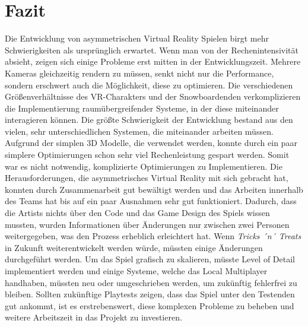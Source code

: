 \chapter{Fazit}
Die Entwicklung von asymmetrischen Virtual Reality Spielen birgt mehr Schwierigkeiten als ursprünglich erwartet. Wenn man von der Rechenintensivität absieht, zeigen sich einige Probleme erst mitten in der Entwicklungszeit. Mehrere Kameras gleichzeitig rendern zu müssen, senkt nicht nur die Performance, sondern erschwert auch die Möglichkeit, diese zu optimieren. Die verschiedenen Größenverhältnisse des VR-Charakters und der Snowboardenden verkomplizieren die Implementierung raumübergreifender Systeme, in der diese miteinander interagieren können. Die größte Schwierigkeit der Entwicklung bestand aus den vielen, sehr unterschiedlichen Systemen, die miteinander arbeiten müssen. Aufgrund der simplen 3D Modelle, die verwendet werden, konnte durch ein paar simplere Optimierungen schon sehr viel Rechenleistung gespart werden. Somit war es nicht notwendig, komplizierte Optimierungen zu Implementieren. Die Herausforderungen, die asymmetrisches Virtual Reality mit sich gebracht hat, konnten durch Zusammenarbeit gut bewältigt werden und das Arbeiten innerhalb des Teams hat bis auf ein paar Ausnahmen sehr gut funktioniert. Dadurch, dass die Artists nichts über den Code und das Game Design des Spiels wissen mussten, wurden Informationen über Änderungen nur zwischen zwei Personen weitergegeben, was den Prozess erheblich erleichtert hat. Wenn \emph{Tricks ´n´ Treats} in Zukunft weiterentwickelt werden würde, müssten einige Änderungen durchgeführt werden. Um das Spiel grafisch zu skalieren, müsste Level of Detail implementiert werden und einige Systeme, welche das Local Multiplayer handhaben, müssten neu oder umgeschrieben werden, um zukünftig fehlerfrei zu bleiben. Sollten zukünftige Playtests zeigen, dass das Spiel unter den Testenden gut ankommt, ist es erstrebenswert, diese komplexen Probleme zu beheben und weitere Arbeitszeit in das Projekt zu investieren.
